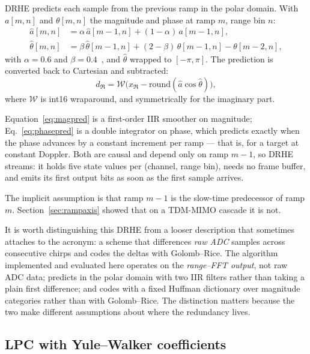 \documentclass[10pt,twocolumn]{article}
\begin{document}
DRHE predicts each sample from the previous ramp in the polar domain. With
$a[m,n]$ and $\theta[m,n]$ the magnitude and phase at ramp $m$, range bin $n$:
\begin{align}
\label{eq:magpred}
\hat{a}[m,n] &= \alpha\,\hat{a}[m-1,n] + (1-\alpha)\,a[m-1,n],\\
\label{eq:phasepred}
\hat{\theta}[m,n] &= \beta\,\hat{\theta}[m-1,n] + (2-\beta)\,\theta[m-1,n]
                      - \theta[m-2,n],
\end{align}
with $\alpha = 0.6$ and $\beta = 0.4$~\cite[Table~4.4]{kiem2023}, and
$\hat{\theta}$ wrapped to $[-\pi,\pi]$. The prediction is converted back to
Cartesian and subtracted:
\begin{equation}
d_{\Re} = \mathcal{W}\bigl(x_{\Re} - \mathrm{round}(\hat{a}\cos\hat{\theta})\bigr),
\end{equation}
where $\mathcal{W}$ is int16 wraparound, and symmetrically for the imaginary
part.

Equation~\eqref{eq:magpred} is a first-order IIR smoother on magnitude;
Eq.~\eqref{eq:phasepred} is a double integrator on phase, which predicts
exactly when the phase advances by a constant increment per ramp --- that is,
for a target at constant Doppler. Both are causal and depend only on ramp
$m-1$, so DRHE streams: it holds five state values per (channel, range bin),
needs no frame buffer, and emits its first output bits as soon as the first
sample arrives.

The implicit assumption is that ramp $m-1$ is the slow-time predecessor of ramp
$m$. Section~\ref{sec:rampaxis} showed that on a TDM-MIMO cascade it is not.

It is worth distinguishing this DRHE from a looser description that sometimes
attaches to the acronym: a scheme that differences \emph{raw ADC} samples across
consecutive chirps and codes the deltas with Golomb--Rice. The algorithm
implemented and evaluated here operates on the \emph{range--FFT output}, not raw
ADC data; predicts in the polar domain with two IIR filters rather than taking a
plain first difference; and codes with a fixed Huffman dictionary over
magnitude categories rather than with Golomb--Rice. The distinction matters
because the two make different assumptions about where the redundancy lives.

\subsection{LPC with Yule--Walker coefficients}
\label{sec:lpc}
\end{document}
